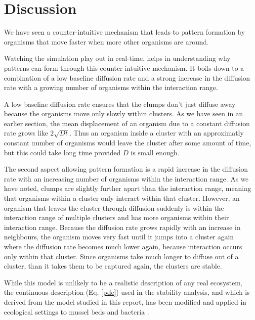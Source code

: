 \documentclass{article}
\begin{document}
\section{Discussion}
We have seen a counter-intuitive mechanism that leads to pattern formation by organisms that move faster when more other organisms are around. 

Watching the simulation play out in real-time, helps in understanding why patterns can form through this counter-intuitive mechanism.
It boils down to a combination of a low baseline diffusion rate and a strong increase in the diffusion rate with a growing number of organisms within the interaction range.

A low baseline diffusion rate ensures that the clumps don't just diffuse away because the organisms move only slowly within clusters.
As we have seen in an earlier section, the mean displacement of an organism due to a constant diffusion rate grows like $2\sqrt{Dt}$. 
Thus an organism inside a cluster with an approximatly constant number of organisms would leave the cluster after some amount of time, but this could take long time provided $D$ is small enough.

The second aspect allowing pattern formation is a rapid increase in the diffusion rate with an increasing number of organisms within the interaction range. 
As we have noted, clumps are slightly further apart than the interaction range, meaning that organisms within a cluster only interact within that cluster.
However, an organism that leaves the cluster through diffusion suddenly is within the interaction range of multiple clusters and has more organisms within their interaction range. 
Because the diffusion rate grows rapidly with an increase in neighbours, the organism moves very fast until it jumps into a cluster again where the diffusion rate becomes much lower again, because interaction occurs only within that cluster.
Since organisms take much longer to diffuse out of a cluster, than it takes them to be captured again, the clusters are stable.


While this model is unlikely to be a realistic description of any real ecosystem, the continuous description (Eq. \ref{pde}) used in the stability analysis, and which is derived from the model studied in this report, has been modified and applied in ecological 
settings to mussel beds and bacteria \autocite{liuPhaseSeparationDriven2016,liuPhaseSeparationExplains2013}.

\end{document}

